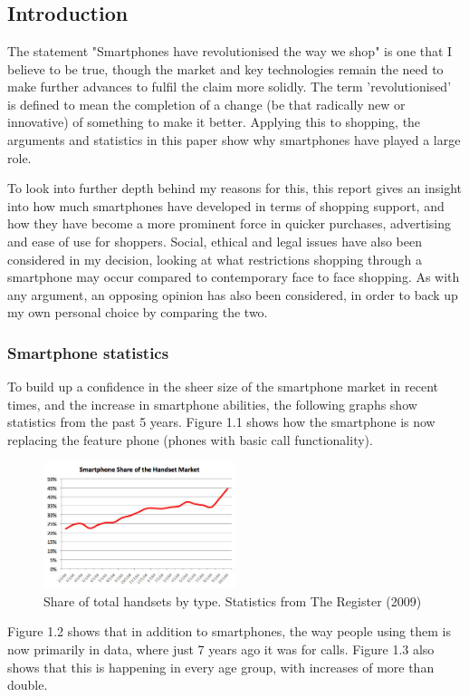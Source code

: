 \chapter{}
\section{Introduction}
The statement "Smartphones have revolutionised the way we shop" is one that I believe to be true, though the market and key technologies remain the need to make further advances to fulfil the claim more solidly.
The term 'revolutionised' is defined to mean the completion of a change (be that radically new or innovative) \cite{dictionary} of something to make it better. Applying this to shopping, the arguments and statistics in this paper show why smartphones have played a large role. \par
To look into further depth behind my reasons for this, this report gives an insight into how much smartphones have developed in terms of shopping support, and how they have become a more prominent force in quicker purchases, advertising and ease of use for shoppers. Social, ethical and legal issues have also been considered in my decision, looking at what restrictions shopping through a smartphone may occur compared to contemporary face to face shopping. As with any argument, an opposing opinion has also been considered, in order to back up my own personal choice by comparing the two. \par

\subsection{Smartphone statistics}

To build up a confidence in the sheer size of the smartphone market in recent times, and the increase in smartphone abilities, the following graphs show statistics from the past 5 years. Figure 1.1 shows how the smartphone is now replacing the feature phone (phones with basic call functionality).
\begin{figure}[H]
  \caption{Share of total handsets by type. Statistics from The Register (2009) \cite{register}}
  \centering
  \label{fig:feature}
    \includegraphics[width=0.5\textwidth]{stat0}
\end{figure}
Figure 1.2 shows that in addition to smartphones, the way people using them is now primarily in data, where just 7 years ago it was for calls. Figure 1.3 also shows that this is happening in every age group, with increases of more than double.

